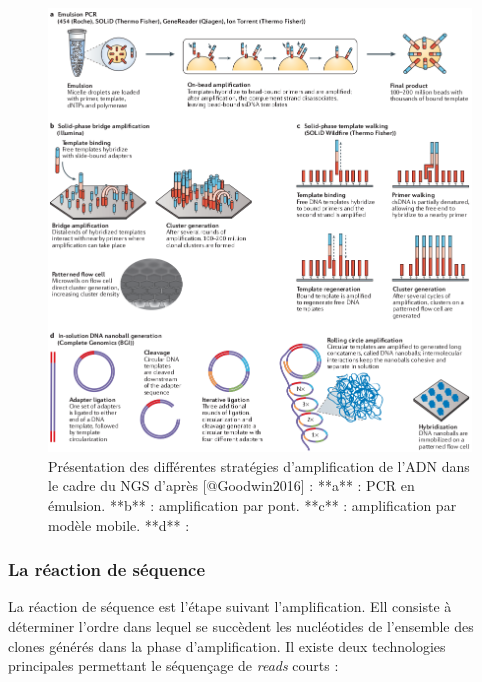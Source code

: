 \documentclass[12pt,twoside]{ugathesis}
\theoremstyle{definition}
\theoremstyle{definition}
\theoremstyle{remark}
\begin{document}
\begin{figure}

{\centering \includegraphics[scale=.455]{figure/ngs_amplification} 

}

\caption[Présentation des différentes stratégies d'amplification de l'ADN dans le cadre du NGS]{Présentation des différentes stratégies d'amplification de l'ADN dans le cadre du NGS d'après [@Goodwin2016] : **a** : PCR en émulsion. **b** : amplification par pont. **c** : amplification par modèle mobile. **d** : }\label{fig:ngsampli}
\end{figure}

\newpage

\subsubsection{La réaction de séquence}\label{la-reaction-de-sequence}

La réaction de séquence est l'étape suivant l'amplification. Ell
consiste à déterminer l'ordre dans lequel se succèdent les nucléotides
de l'ensemble des clones générés dans la phase d'amplification. Il
existe deux technologies principales permettant le séquençage de
\emph{reads} courts :\\
\end{document}
